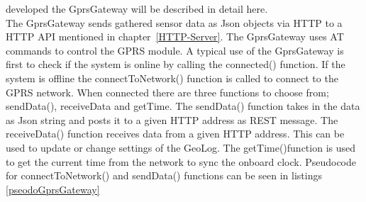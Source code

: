 developed the GprsGateway will be described in detail here.\\
The GprsGateway sends gathered sensor data as Json objects via HTTP to a HTTP API
mentioned in chapter~\ref{HTTP-Server}. The GprsGateway uses AT commands\cite{ATcommands} to control the GPRS module. A typical use of the GprsGateway is first to check if the system is online by calling the connected() function. If the system is offline the 
connectToNetwork() function is called to connect to the GPRS network. When connected 
there are three functions to choose from; sendData(), receiveData and getTime. The 
sendData() function takes in the data as Json string and posts it to a given HTTP address
as REST\cite{rest} message. The receiveData() function receives data from a given HTTP
address. This can be used to update or change settings of the GeoLog. The getTime()function is used to get the current time from the network to sync the onboard clock.
Pseudocode for connectToNetwork() and sendData() functions can be seen in listings 
\ref{pseodoGprsGateway}

